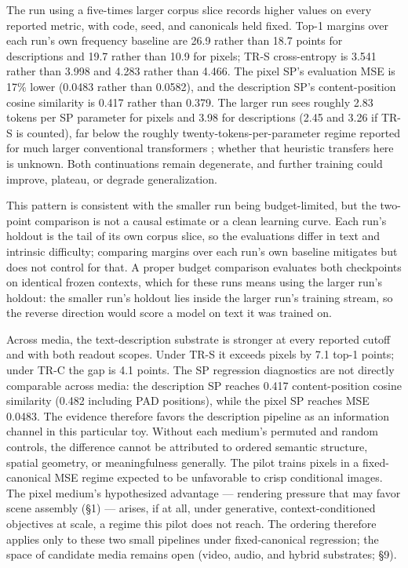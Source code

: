 \documentclass[11pt,a4paper]{article}
\begin{document}
The run using a five-times larger corpus slice records higher values on every reported metric, with code, seed, and canonicals held fixed. Top-1 margins over each run's own frequency baseline are 26.9 rather than 18.7 points for descriptions and 19.7 rather than 10.9 for pixels; TR-S cross-entropy is 3.541 rather than 3.998 and 4.283 rather than 4.466. The pixel SP's evaluation MSE is 17\% lower (0.0483 rather than 0.0582), and the description SP's content-position cosine similarity is 0.417 rather than 0.379. The larger run sees roughly 2.83 tokens per SP parameter for pixels and 3.98 for descriptions (2.45 and 3.26 if TR-S is counted), far below the roughly twenty-tokens-per-parameter regime reported for much larger conventional transformers \cite{chinchilla2022}; whether that heuristic transfers here is unknown. Both continuations remain degenerate, and further training could improve, plateau, or degrade generalization.

This pattern is consistent with the smaller run being budget-limited, but the two-point comparison is not a causal estimate or a clean learning curve. Each run's holdout is the tail of its own corpus slice, so the evaluations differ in text and intrinsic difficulty; comparing margins over each run's own baseline mitigates but does not control for that. A proper budget comparison evaluates both checkpoints on identical frozen contexts, which for these runs means using the larger run's holdout: the smaller run's holdout lies inside the larger run's training stream, so the reverse direction would score a model on text it was trained on.

Across media, the text-description substrate is stronger at every reported cutoff and with both readout scopes. Under TR-S it exceeds pixels by 7.1 top-1 points; under TR-C the gap is 4.1 points. The SP regression diagnostics are not directly comparable across media: the description SP reaches 0.417 content-position cosine similarity (0.482 including PAD positions), while the pixel SP reaches MSE 0.0483. The evidence therefore favors the description pipeline as an information channel in this particular toy. Without each medium's permuted and random controls, the difference cannot be attributed to ordered semantic structure, spatial geometry, or meaningfulness generally. The pilot trains pixels in a fixed-canonical MSE regime expected to be unfavorable to crisp conditional images. The pixel medium's hypothesized advantage --- rendering pressure that may favor scene assembly (§1) --- arises, if at all, under generative, context-conditioned objectives at scale, a regime this pilot does not reach. The ordering therefore applies only to these two small pipelines under fixed-canonical regression; the space of candidate media remains open (video, audio, and hybrid substrates; §9).
\end{document}
